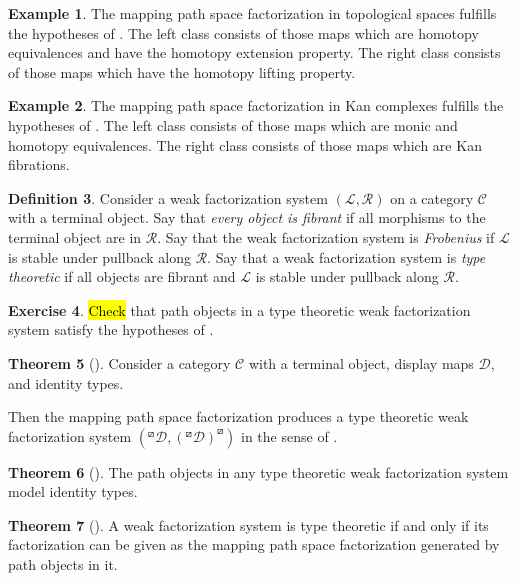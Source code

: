 \documentclass{article}
\theoremstyle{definition}
\newtheorem{definition}{Definition}[section]
\newtheorem{theorem}[definition]{Theorem}
\newtheorem{exercise}[definition]{Exercise}
\newtheorem{example}[definition]{Example}
\newcommand{\C}{\mathcal C}
\newcommand{\D}{\mathcal D}
\begin{document}
\begin{example}
    The mapping path space factorization in topological spaces fulfills the hypotheses of . The left class consists of those maps which are homotopy equivalences and have the homotopy extension property. The right class consists of those maps which have the homotopy lifting property.
\end{example}

\begin{example}
    The mapping path space factorization in Kan complexes fulfills the hypotheses of . The left class consists of those maps which are monic and homotopy equivalences. The right class consists of those maps which are Kan fibrations.
\end{example}

\begin{definition}
    Consider a weak factorization system $(\mathcal L, \mathcal R)$ on a category $\C$ with a terminal object. Say that \emph{every object is fibrant} if all morphisms to the terminal object are in $\mathcal R$. Say that the weak factorization system is \emph{Frobenius} if $\mathcal L$ is stable under pullback along $\mathcal R$. Say that a weak factorization system is \emph{type theoretic} if all objects are fibrant and $\mathcal L$ is stable under pullback along $\mathcal R$.
\end{definition}

\begin{exercise}
    \hl{Check} that path objects in a type theoretic weak factorization system satisfy the hypotheses of .
\end{exercise}

\begin{theorem}[\cite{gambino-garner}]
    Consider a category $\C$ with a terminal object, display maps $\D$, and identity types. 

    Then the mapping path space factorization produces a type theoretic weak factorization system $(^\boxslash\D, ({^\boxslash}\D)^\boxslash)$ in the sense of .
\end{theorem}

\begin{theorem}[\cite{north}]
    The path objects in any type theoretic weak factorization system model identity types.
\end{theorem}

\begin{theorem}[\cite{north}]
    A weak factorization system is type theoretic if and only if its factorization can be given as the mapping path space factorization generated by path objects in it.
\end{theorem}



\end{document}
